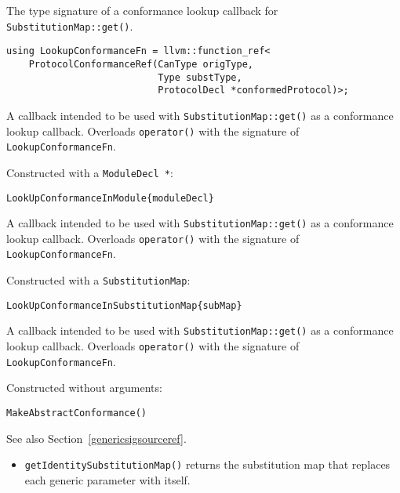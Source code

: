 \documentclass[../generics]{subfiles}
\begin{document}
The type signature of a conformance lookup callback for \texttt{SubstitutionMap::get()}.
\begin{verbatim}
using LookupConformanceFn = llvm::function_ref<
    ProtocolConformanceRef(CanType origType,
                           Type substType,
                           ProtocolDecl *conformedProtocol)>;
\end{verbatim}

A callback intended to be used with \texttt{SubstitutionMap::get()} as a conformance lookup callback. Overloads \texttt{operator()} with the signature of \texttt{LookupConformanceFn}.

Constructed with a \texttt{ModuleDecl *}:
\begin{Verbatim}
LookUpConformanceInModule{moduleDecl}
\end{Verbatim}

A callback intended to be used with \texttt{SubstitutionMap::get()} as a conformance lookup callback. Overloads \texttt{operator()} with the signature of \texttt{LookupConformanceFn}.

Constructed with a \texttt{SubstitutionMap}:
\begin{Verbatim}
LookUpConformanceInSubstitutionMap{subMap}
\end{Verbatim}

A callback intended to be used with \texttt{SubstitutionMap::get()} as a conformance lookup callback. Overloads \texttt{operator()} with the signature of \texttt{LookupConformanceFn}.

Constructed without arguments:
\begin{Verbatim}
MakeAbstractConformance()
\end{Verbatim}

See also Section~\ref{genericsigsourceref}.

\begin{itemize}
\item \texttt{getIdentitySubstitutionMap()} returns the substitution map that replaces each generic parameter with itself.
\end{itemize}
\end{document}
